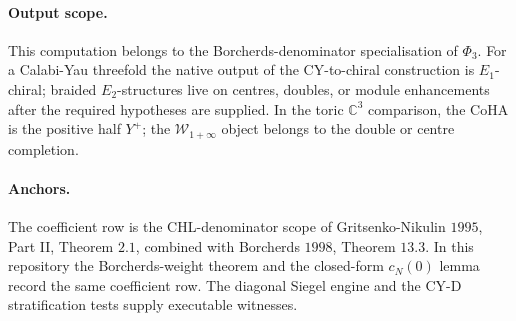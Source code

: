 \paragraph{Output scope.}
This computation belongs to the Borcherds-denominator specialisation of
\(\Phi_3\).  For a Calabi-Yau threefold the native output of the
CY-to-chiral construction is \(E_1\)-chiral; braided \(E_2\)-structures
live on centres, doubles, or module enhancements after the required
hypotheses are supplied.  In the toric \(\mathbb C^3\) comparison, the
CoHA is the positive half \(Y^+\); the \(\mathcal W_{1+\infty}\) object
belongs to the double or centre completion.

\paragraph{Anchors.}
The coefficient row is the CHL-denominator scope of
Gritsenko-Nikulin \(1995\), Part II, Theorem \(2.1\), combined with
Borcherds \(1998\), Theorem \(13.3\).  In this repository the
Borcherds-weight theorem and the closed-form \(c_N(0)\) lemma record
the same coefficient row.  The diagonal Siegel engine and the CY-D
stratification tests supply executable witnesses.
